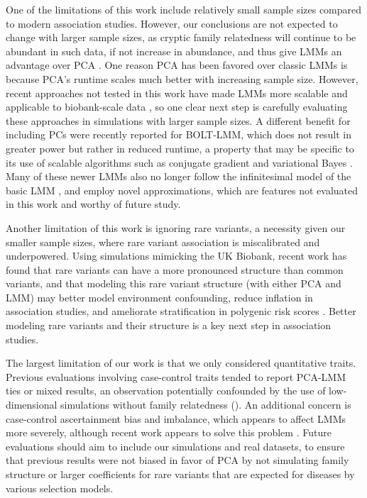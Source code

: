\documentclass[9pt,lineno]{elife}
\begin{document}
One of the limitations of this work include relatively small sample sizes compared to modern association studies.
However, our conclusions are not expected to change with larger sample sizes, as cryptic family relatedness will continue to be abundant in such data, if not increase in abundance, and thus give LMMs an advantage over PCA \citep{henn_cryptic_2012, shchur_number_2018, loh_mixed-model_2018}.
One reason PCA has been favored over classic LMMs is because PCA's runtime scales much better with increasing sample size.
However, recent approaches not tested in this work have made LMMs more scalable and applicable to biobank-scale data \citep{loh_efficient_2015, zhou_efficiently_2018, mbatchou_computationally_2021}, so one clear next step is carefully evaluating these approaches in simulations with larger sample sizes.
A different benefit for including PCs were recently reported for BOLT-LMM, which does not result in greater power but rather in reduced runtime, a property that may be specific to its use of scalable algorithms such as conjugate gradient and variational Bayes \citep{loh_mixed-model_2018}.
Many of these newer LMMs also no longer follow the infinitesimal model of the basic LMM \citep{loh_efficient_2015, mbatchou_computationally_2021}, and employ novel approximations, which are features not evaluated in this work and worthy of future study.

Another limitation of this work is ignoring rare variants, a necessity given our smaller sample sizes, where rare variant association is miscalibrated and underpowered.
Using simulations mimicking the UK Biobank, recent work has found that rare variants can have a more pronounced structure than common variants, and that modeling this rare variant structure (with either PCA and LMM) may better model environment confounding, reduce inflation in association studies, and ameliorate stratification in polygenic risk scores \citep{zaidi_demographic_2020}.
Better modeling rare variants and their structure is a key next step in association studies.

The largest limitation of our work is that we only considered quantitative traits.
Previous evaluations involving case-control traits tended to report PCA-LMM ties or mixed results, an observation potentially confounded by the use of low-dimensional simulations without family relatedness ().
An additional concern is case-control ascertainment bias and imbalance, which appears to affect LMMs more severely, although recent work appears to solve this problem \citep{yang_advantages_2014, zhou_efficiently_2018}.
Future evaluations should aim to include our simulations and real datasets, to ensure that previous results were not biased in favor of PCA by not simulating family structure or larger coefficients for rare variants that are expected for diseases by various selection models.
\end{document}
